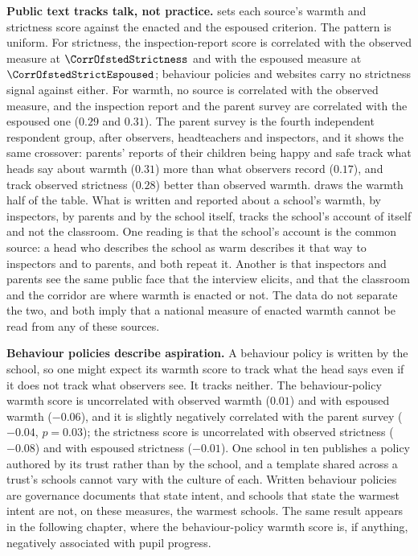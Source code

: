 \textbf{Public text tracks talk, not practice.} 
sets each source's warmth and strictness score against the enacted and the
espoused criterion. The pattern is uniform. For strictness, the
inspection-report score is correlated with the observed measure at
$\CorrOfstedStrictness$ and with the espoused measure at
$\CorrOfstedStrictEspoused$; behaviour policies and websites carry no
strictness signal against either. For warmth, no source is correlated with
the observed measure, and the inspection report and the parent survey are
correlated with the espoused one ($0.29$ and $0.31$). The parent survey is
the fourth independent respondent group, after observers, headteachers and
inspectors, and it shows the same crossover: parents' reports of their
children being happy and safe track what heads say about warmth ($0.31$) more
than what observers record ($0.17$), and track observed strictness ($0.28$)
better than observed warmth.  draws the warmth half
of the table. What is written and reported about a school's warmth, by
inspectors, by parents and by the school itself, tracks the school's account
of itself and not the classroom. One reading is that the school's account is
the common source: a head who describes the school as warm describes it that
way to inspectors and to parents, and both repeat it. Another is that
inspectors and parents see the same public face that the interview elicits,
and that the classroom and the corridor are where warmth is enacted or not.
The data do not separate the two, and both imply that a national measure of
enacted warmth cannot be read from any of these sources.



\textbf{Behaviour policies describe aspiration.} A behaviour policy is
written by the school, so one might expect its warmth score to track what
the head says even if it does not track what observers see. It tracks
neither. The behaviour-policy warmth score is uncorrelated with observed
warmth ($0.01$) and with espoused warmth ($-0.06$), and it is slightly
negatively correlated with the parent survey ($-0.04$, $p = 0.03$); the
strictness score is uncorrelated with observed strictness ($-0.08$) and with
espoused strictness ($-0.01$). One school in ten publishes a policy authored
by its trust rather than by the school, and a template shared across a
trust's schools cannot vary with the culture of each. Written behaviour
policies are governance documents that state intent, and schools that state
the warmest intent are not, on these measures, the warmest schools. The same
result appears in the following chapter, where the behaviour-policy warmth
score is, if anything, negatively associated with pupil progress.

